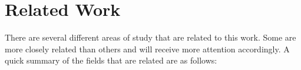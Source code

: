 \chapter{Related Work}
\label{chap:related_works}

There are several different areas of study that are related to this work. Some are more closely related than others and will receive more attention accordingly. A quick summary of the fields that are related are as follows: 










